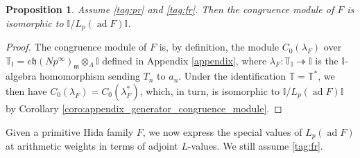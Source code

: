 \documentclass[12pt]{amsart}
\newcommand\bI{\mathbb{I}}
\newcommand\bT{\mathbb{T}}
\newcommand\gh{\mathfrak{h}}
\newcommand\gm{\mathfrak{m}}
\DeclareMathOperator{\ad}{ad}
\theoremstyle{defstyle}
\theoremstyle{thmstyle}
\newtheorem{proposition}[subsubsection]{Proposition}
\begin{document}
\begin{proposition}\label{prop:congruence_module_and_p_adic_L_functions}
		Assume \eqref{tag:pr} and \eqref{tag:fr}. Then the congruence module of $F$ is isomorphic to $\bI/L_p(\ad F)\bI$. 
\end{proposition}
\begin{proof}
	The congruence module of $F$ is, by definition, the module $C_0(\lambda_F)$ over $\bT_\bI=e\gh(Np^\infty)_{\gm}\otimes_\Lambda \bI$ defined in Appendix \ref{appendix}, where $\lambda_F \colon \bT_\bI \twoheadrightarrow \bI$ is the $\bI$-algebra homomorphism sending $T_n$ to $a_n$. Under the identification $\bT=\bT^*$, we then have $C_0(\lambda_F)=C_0(\lambda_F^*)$, which, in turn, is isomorphic to $\bI/L_p(\ad F)\bI$ by Corollary \ref{coro:appendix_generator_congruence_module}.
\end{proof}
Given a primitive Hida family $F$, we now express the special values of $L_p(\ad F)$ at arithmetic weights in terms of adjoint $L$-values. We still assume \eqref{tag:fr}. 
\end{document}
